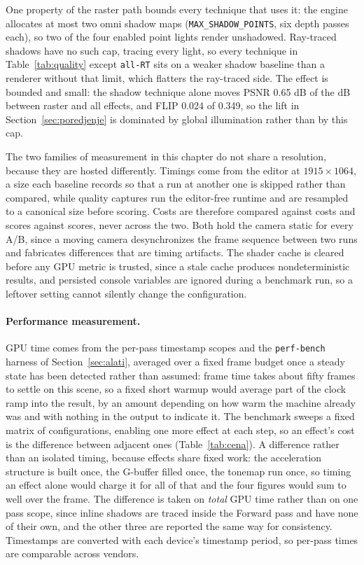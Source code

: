 One property of the raster path bounds every technique that uses it: the engine allocates at most two
omni shadow maps (\texttt{MAX\_SHADOW\_POINTS}, six depth passes each), so two of the four enabled
point lights render unshadowed. Ray-traced shadows have no such cap, tracing every light, so
every technique in Table~\ref{tab:quality} except \texttt{all-RT} sits on a weaker shadow baseline
than a renderer without that limit, which flatters the ray-traced side. The effect is bounded and
small: the shadow technique alone moves PSNR 0.65 dB of the \qRtLiftPsnr{} dB between raster and all effects,
and FLIP 0.024 of 0.349, so the lift in Section~\ref{sec:poredjenje} is dominated by global
illumination rather than by this cap.

The two families of measurement in this chapter do not share a resolution, because they are hosted
differently. Timings come from the editor at $1915 \times 1064$, a size each baseline records so that
a run at another one is skipped rather than compared, while quality captures run the editor-free
runtime and are resampled to a canonical size before scoring. Costs are therefore compared against
costs and scores against scores, never across the two. Both hold the camera static for every A/B,
since a moving camera desynchronizes the frame sequence between two runs and fabricates differences
that are timing artifacts. The shader cache is cleared before any GPU metric is trusted, since a
stale cache produces nondeterministic results, and persisted console variables are ignored during a
benchmark run, so a leftover setting cannot silently change the configuration.

\paragraph{Performance measurement.} GPU time comes from the per-pass timestamp scopes and the
\texttt{perf-bench} harness of Section~\ref{sec:alati}, averaged over a fixed frame budget once a
steady state has been detected rather than assumed: frame time takes about fifty frames to settle on
this scene, so a fixed short warmup would average part of the clock ramp into the result, by an
amount depending on how warm the machine already was and with nothing in the output to indicate it.
The benchmark sweeps a fixed matrix of configurations, enabling one more effect at each step, so an
effect's cost is the difference between adjacent ones (Table~\ref{tab:cena}). A difference rather
than an isolated timing, because effects share fixed work: the acceleration structure is built once,
the G-buffer filled once, the tonemap run once, so timing an effect alone would charge it for all of
that and the four figures would sum to well over the frame. The difference is taken on \emph{total}
GPU time rather than on one pass scope, since inline shadows are traced inside the Forward pass and
have none of their own, and the other three are reported the same way for consistency. Timestamps are
converted with each device's timestamp period, so per-pass times are comparable across vendors.

